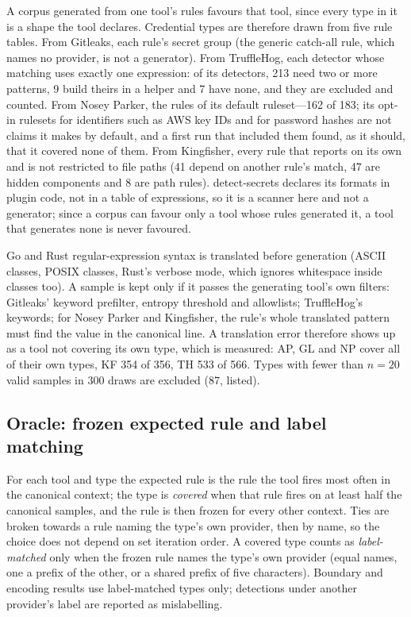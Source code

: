 \documentclass[10pt,journal,compsoc]{IEEEtran}
\begin{document}
A corpus generated from one tool's rules favours that tool, since every type in it is a shape the tool declares. Credential types are therefore drawn from five rule tables. From Gitleaks, each rule's secret group (the generic catch-all rule, which names no provider, is not a generator). From TruffleHog, each detector whose matching uses exactly one expression: of its detectors, 213 need two or more patterns, 9 build theirs in a helper and 7 have none, and they are excluded and counted. From Nosey Parker, the rules of its default ruleset---162 of 183; its opt-in rulesets for identifiers such as AWS key IDs and for password hashes are not claims it makes by default, and a first run that included them found, as it should, that it covered none of them. From Kingfisher, every rule that reports on its own and is not restricted to file paths (41 depend on another rule's match, 47 are hidden components and 8 are path rules). detect-secrets declares its formats in plugin code, not in a table of expressions, so it is a scanner here and not a generator; since a corpus can favour only a tool whose rules generated it, a tool that generates none is never favoured.

Go and Rust regular-expression syntax is translated before generation (ASCII classes, POSIX classes, Rust's verbose mode, which ignores whitespace inside classes too). A sample is kept only if it passes the generating tool's own filters: Gitleaks' keyword prefilter, entropy threshold and allowlists; TruffleHog's keywords; for Nosey Parker and Kingfisher, the rule's whole translated pattern must find the value in the canonical line. A translation error therefore shows up as a tool not covering its own type, which is measured: AP, GL and NP cover all of their own types, KF 354 of 356, TH 533 of 566. Types with fewer than $n=20$ valid samples in 300 draws are excluded (87, listed).

\subsection{Oracle: frozen expected rule and label matching}
\label{sec:oracle}

For each tool and type the expected rule is the rule the tool fires most often in the canonical context; the type is \emph{covered} when that rule fires on at least half the canonical samples, and the rule is then frozen for every other context. Ties are broken towards a rule naming the type's own provider, then by name, so the choice does not depend on set iteration order. A covered type counts as \emph{label-matched} only when the frozen rule names the type's own provider (equal names, one a prefix of the other, or a shared prefix of five characters). Boundary and encoding results use label-matched types only; detections under another provider's label are reported as mislabelling.
\end{document}
